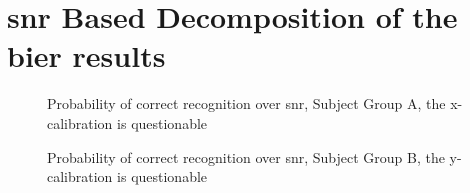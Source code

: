 \section{\gls{snr} Based Decomposition of the \gls{bier} results}

\begin{figure}[H]
\centering

\caption{Probability of correct recognition over \gls{snr}, Subject Group A, the x-calibration is questionable}
\label{fig:group_A_decomp}
\end{figure}


\begin{figure}[H]
\centering

\caption{Probability of correct recognition over \gls{snr}, Subject Group B, the y-calibration is questionable}
\label{fig:group_B_decomp}
\end{figure}